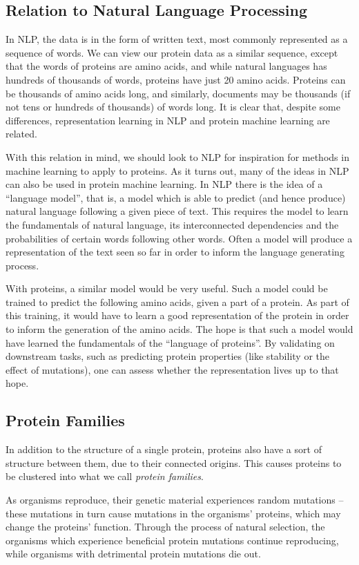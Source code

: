\subsection{Relation to Natural Language Processing}
In NLP, the data is in the form of written text, most commonly represented as a sequence of words. We can view our protein data as a similar sequence, except that the words of proteins are amino acids, and while natural languages has hundreds of thousands of words, proteins have just 20 amino acids. Proteins can be thousands of amino acids long, and similarly, documents may be thousands (if not tens or hundreds of thousands) of words long. It is clear that, despite some differences, representation learning in NLP and protein machine learning are related.

With this relation in mind, we should look to NLP for inspiration for methods in machine learning to apply to proteins. As it turns out, many of the ideas in NLP can also be used in protein machine learning. In NLP there is the idea of a ``language model'', that is, a model which is able to predict (and hence produce) natural language following a given piece of text. This requires the model to learn the fundamentals of natural language, its interconnected dependencies and the probabilities of certain words following other words. Often a model will produce a representation of the text seen so far in order to inform the language generating process.

With proteins, a similar model would be very useful. Such a model could be trained to predict the following amino acids, given a part of a protein. As part of this training, it would have to learn a good representation of the protein in order to inform the generation of the amino acids. The hope is that such a model would have learned the fundamentals of the ``language of proteins''. By validating on downstream tasks, such as predicting protein properties (like stability or the effect of mutations), one can assess whether the representation lives up to that hope.

\subsection{Protein Families}
\label{sec:protein_families}
In addition to the structure of a single protein, proteins also have a sort of structure between them, due to their connected origins. This causes proteins to be clustered into what we call \textit{protein families}.

As organisms reproduce, their genetic material experiences random mutations -- these mutations in turn cause mutations in the organisms' proteins, which may change the proteins' function. Through the process of natural selection, the organisms which experience beneficial protein mutations continue reproducing, while organisms with detrimental protein mutations die out.

